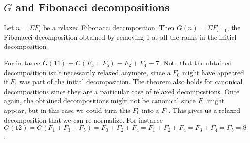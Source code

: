 \documentclass[a4paper,11pt]{article}
\begin{document}
\subsection{$G$ and Fibonacci decompositions}

\begin{theorem}\label{Gshift}
Let $n = \Sigma F_i$ be a relaxed Fibonacci decomposition.
Then $G(n) = \Sigma F_{i-1}$, the Fibonacci decomposition obtained
by removing 1 at all the ranks in the initial decomposition.
\end{theorem}

For instance $G(11) = G(F_3+F_5) = F_2 + F_4 = 7$. Note that the
obtained decomposition isn't necessarily relaxed anymore, since a
$F_0$ might have appeared if $F_1$ was part of the initial
decomposition. The theorem also holds for canonical decompositions
since they are a particular case of relaxed decompostions. Once again,
the obtained decompositions might not be canonical since $F_0$ might
appear, but in this case we could turn this $F_0$ into a $F_1$. This
gives us a relaxed decomposition that we can re-normalize. For
instance $G(12) = G(F_1+F_3+F_5) = F_0+F_2+F_4 = F_1+F_2+F_4 = F_3+F_4
= F_5 = 8$.
 
\end{document}
